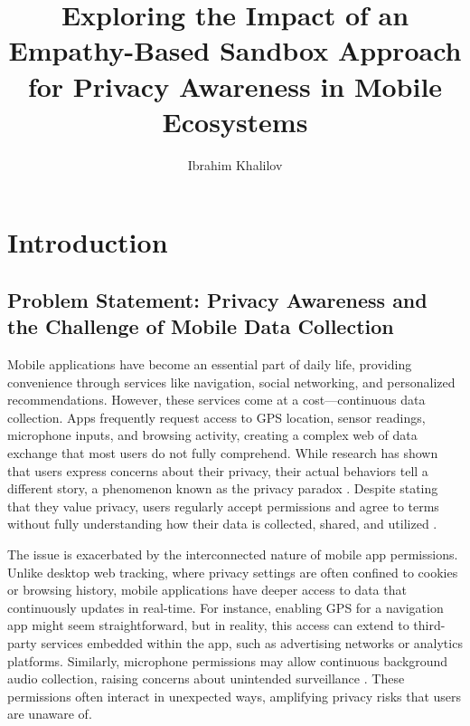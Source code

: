 \documentclass[acmlarge, nonacm]{acmart}
\begin{document}
\title{Exploring the Impact of an Empathy-Based Sandbox
Approach for Privacy Awareness in Mobile Ecosystems}

\author{Ibrahim Khalilov}


\renewcommand{\shortauthors}{Khalilov et al.}

\maketitle

\section{Introduction}

\subsection{Problem Statement: Privacy Awareness and the Challenge of Mobile Data Collection}

Mobile applications have become an essential part of daily life, providing convenience through services like navigation, social networking, and personalized recommendations. However, these services come at a cost—continuous data collection. Apps frequently request access to GPS location, sensor readings, microphone inputs, and browsing activity, creating a complex web of data exchange that most users do not fully comprehend. While research has shown that users express concerns about their privacy, their actual behaviors tell a different story, a phenomenon known as the privacy paradox \cite{baruh2017big}. Despite stating that they value privacy, users regularly accept permissions and agree to terms without fully understanding how their data is collected, shared, and utilized \cite{kokolakis2017privacy}.

The issue is exacerbated by the interconnected nature of mobile app permissions. Unlike desktop web tracking, where privacy settings are often confined to cookies or browsing history, mobile applications have deeper access to data that continuously updates in real-time. For instance, enabling GPS for a navigation app might seem straightforward, but in reality, this access can extend to third-party services embedded within the app, such as advertising networks or analytics platforms. Similarly, microphone permissions may allow continuous background audio collection, raising concerns about unintended surveillance \cite{Gao2019}. These permissions often interact in unexpected ways, amplifying privacy risks that users are unaware of.
\end{document}
